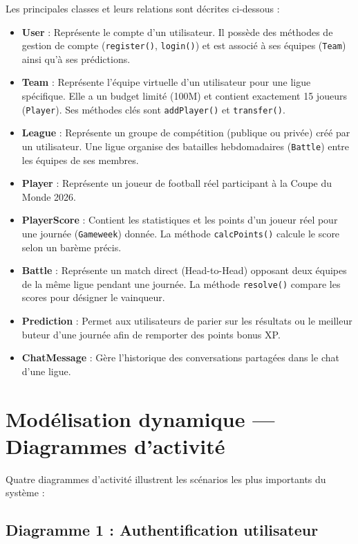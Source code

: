 \vspace{0.5cm}
Les principales classes et leurs relations sont décrites ci-dessous :
\begin{itemize}
    \item \textbf{User} : Représente le compte d'un utilisateur. Il possède des méthodes de gestion de compte (\texttt{register()}, \texttt{login()}) et est associé à ses équipes (\texttt{Team}) ainsi qu'à ses prédictions.
    \item \textbf{Team} : Représente l'équipe virtuelle d'un utilisateur pour une ligue spécifique. Elle a un budget limité (100M) et contient exactement 15 joueurs (\texttt{Player}). Ses méthodes clés sont \texttt{addPlayer()} et \texttt{transfer()}.
    \item \textbf{League} : Représente un groupe de compétition (publique ou privée) créé par un utilisateur. Une ligue organise des batailles hebdomadaires (\texttt{Battle}) entre les équipes de ses membres.
    \item \textbf{Player} : Représente un joueur de football réel participant à la Coupe du Monde 2026.
    \item \textbf{PlayerScore} : Contient les statistiques et les points d'un joueur réel pour une journée (\texttt{Gameweek}) donnée. La méthode \texttt{calcPoints()} calcule le score selon un barème précis.
    \item \textbf{Battle} : Représente un match direct (Head-to-Head) opposant deux équipes de la même ligue pendant une journée. La méthode \texttt{resolve()} compare les scores pour désigner le vainqueur.
    \item \textbf{Prediction} : Permet aux utilisateurs de parier sur les résultats ou le meilleur buteur d'une journée afin de remporter des points bonus XP.
    \item \textbf{ChatMessage} : Gère l'historique des conversations partagées dans le chat d'une ligue.
\end{itemize}

\section{Modélisation dynamique --- Diagrammes d'activité}

Quatre diagrammes d'activité illustrent les scénarios les plus importants du système :

\subsection{Diagramme 1 : Authentification utilisateur}

